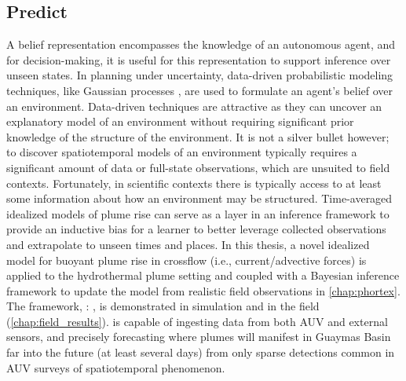 \subsection{Predict}
A belief representation encompasses the knowledge of an autonomous agent, and for decision-making, it is useful for this representation to support inference over unseen states. 
In planning under uncertainty, data-driven probabilistic modeling techniques, like Gaussian processes \autocite{Rasmussen2004}, are used to formulate an agent's belief over an environment.
Data-driven techniques are attractive as they can uncover an explanatory model of an environment without requiring significant prior knowledge of the structure of the environment.
It is not a silver bullet however; to discover spatiotemporal models of an environment typically requires a significant amount of data or full-state observations, which are unsuited to field contexts.
Fortunately, in scientific contexts there is typically access to at least some information about how an environment may be structured.
Time-averaged idealized models of plume rise can serve as a layer in an inference framework to provide an inductive bias for a learner to better leverage collected observations and extrapolate to unseen times and places.
In this thesis, a novel idealized model for buoyant plume rise in crossflow (i.e., current/advective forces) is applied to the hydrothermal plume setting \autocite{tohidi2016highly} and coupled with a Bayesian inference framework to update the model from realistic field observations in \cref{chap:phortex}.
The framework, \PHUMES: \phumes, is demonstrated in simulation and in the field (\cref{chap:field_results}).
\PHUMES is capable of ingesting data from both AUV \Sentry and external sensors, and precisely forecasting where plumes will manifest in Guaymas Basin far into the future (at least several days) from only sparse detections common in AUV surveys of spatiotemporal phenomenon.

